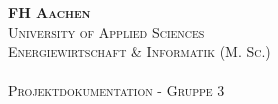 

\begin{titlepage}
  
  \thispagestyle{empty}
  
  \makebox[0pt][l]{
    \begin{picture}(50,50)
      \put(543, -155){
        \hfill
        \texttt{[image: ./images/fh-logo-right.pdf]} %
      }
    \end{picture}
  }

  \begin{center}
    {\Large \textsc{\textbf{FH Aachen}}}\\[0.2cm]
    {\large \textsc{University of Applied Sciences}}\\
    {\large \textsc{Energiewirtschaft \& Informatik (M. Sc.)}}\\[1cm]

    {\Huge \textsc{\textbf{\modulname}}}\\[0.2cm]
    {\Large \textsc{Projektdokumentation - Gruppe 3}}\\[0.2cm]
    {\textsc{\semester}}\\
  \end{center}


  \vspace{2cm}
  

  \noindent{}

  \end{titlepage}
 